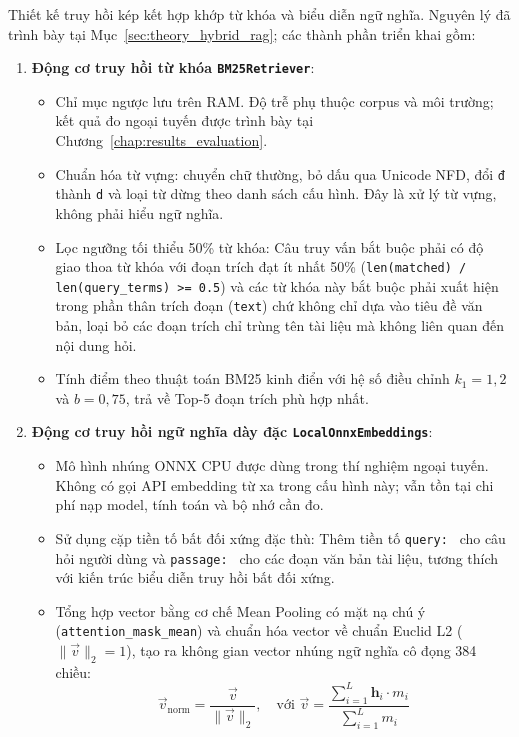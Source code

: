 Thiết kế truy hồi kép kết hợp khớp từ khóa và biểu diễn ngữ nghĩa. Nguyên lý đã trình bày tại Mục~\ref{sec:theory_hybrid_rag}; các thành phần triển khai gồm:
\begin{enumerate}[nosep]
  \item \textbf{Động cơ truy hồi từ khóa \texttt{BM25Retriever}}:
  \begin{itemize}[nosep]
    \item Chỉ mục ngược lưu trên RAM. Độ trễ phụ thuộc corpus và môi trường; kết quả đo ngoại tuyến được trình bày tại Chương~\ref{chap:results_evaluation}.
    \item Chuẩn hóa từ vựng: chuyển chữ thường, bỏ dấu qua Unicode NFD, đổi \texttt{đ} thành \texttt{d} và loại từ dừng theo danh sách cấu hình. Đây là xử lý từ vựng, không phải hiểu ngữ nghĩa.
    \item Lọc ngưỡng tối thiểu 50\% từ khóa: Câu truy vấn bắt buộc phải có độ giao thoa từ khóa với đoạn trích đạt ít nhất 50\% (\texttt{len(matched) / len(query\_terms) >= 0.5}) và các từ khóa này bắt buộc phải xuất hiện trong phần thân trích đoạn (\texttt{text}) chứ không chỉ dựa vào tiêu đề văn bản, loại bỏ các đoạn trích chỉ trùng tên tài liệu mà không liên quan đến nội dung hỏi.
    \item Tính điểm theo thuật toán BM25 kinh điển với hệ số điều chỉnh $k_1 = 1{,}2$ và $b = 0{,}75$, trả về Top-5 đoạn trích phù hợp nhất.
  \end{itemize}
  \item \textbf{Động cơ truy hồi ngữ nghĩa dày đặc \texttt{LocalOnnxEmbeddings}}:
  \begin{itemize}[nosep]
    \item Mô hình nhúng ONNX CPU được dùng trong thí nghiệm ngoại tuyến. Không có gọi API embedding từ xa trong cấu hình này; vẫn tồn tại chi phí nạp model, tính toán và bộ nhớ cần đo.
    \item Sử dụng cặp tiền tố bất đối xứng đặc thù: Thêm tiền tố \texttt{query: } cho câu hỏi người dùng và \texttt{passage: } cho các đoạn văn bản tài liệu, tương thích với kiến trúc biểu diễn truy hồi bất đối xứng.
    \item Tổng hợp vector bằng cơ chế Mean Pooling có mặt nạ chú ý (\texttt{attention\_mask\_mean}) và chuẩn hóa vector về chuẩn Euclid L2 ($\|\vec{v}\|_2 = 1$), tạo ra không gian vector nhúng ngữ nghĩa cô đọng 384 chiều:
    \begin{equation}
    \vec{v}_{\text{norm}} = \frac{\vec{v}}{\|\vec{v}\|_2}, \quad \text{với } \vec{v} = \frac{\sum_{i=1}^{L} \mathbf{h}_i \cdot m_i}{\sum_{i=1}^{L} m_i}

\end{equation}
\end{itemize}
\end{enumerate}
